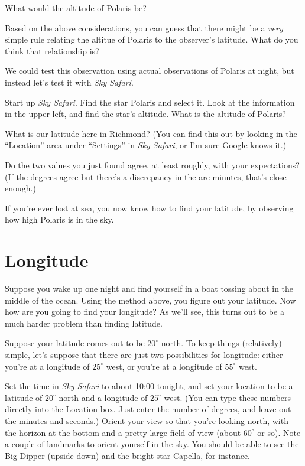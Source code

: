 \vskip 1in

What would the altitude of Polaris be?

\vskip 1in

Based on the above considerations, you can guess that there might
be a \textit{very} simple rule relating the altitue of Polaris
to the observer's latitude. What do you think that relationship is?

\vskip 1in

We could test this observation using actual observations of Polaris at
night, but instead let's test it with \textit{Sky Safari}. 

Start up \textit{Sky Safari}. 
Find the star Polaris and select it. Look at the information in
the upper left, and find the star's altitude. What is the altitude of
Polaris?

\vskip 1in

What is our latitude here in Richmond? (You can find this out by looking
in the 
``Location'' area under ``Settings'' in \textit{Sky
Safari}, or I'm sure Google knows it.)
\vskip 1in

Do the two values you just found agree, at least roughly, with your
expectations? (If the degrees agree but there's a discrepancy in the
arc-minutes, that's close enough.)

\vskip 1in

If you're ever lost at sea, you now know how to find your latitude,
by observing how high Polaris is in the sky.

\section*{Longitude}

Suppose you wake up one night and find yourself in a boat tossing about
in the middle of the ocean. Using the method above, you figure out
your latitude. Now how are you going to find your longitude? As we'll see,
this
turns out to be a much harder problem than finding latitude.

Suppose your
latitude comes out to be $20^\circ$ north. 
To keep things (relatively) simple, let's suppose that there
are just two possibilities
for longitude: either you're at a longitude of $25^\circ$ west,
or you're at a longitude of $55^\circ$ west. 

Set the time in \textit{Sky Safari} to about 10:00 tonight,
and set your location to be a latitude of $20^\circ$ north and
a longitude of $25^\circ$ west. (You can type these numbers
directly into the Location box. Just enter the
number of degrees, and leave out the minutes and
seconds.) Orient your view so that you're looking north,
with the horizon at the bottom and a pretty large 
field of view (about $60^\circ$ or so). Note a couple of
landmarks to orient yourself in the sky. You should be able
to see the Big Dipper (upside-down) and the bright star Capella, for
instance.

